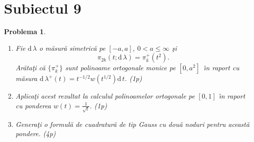 \documentclass[a4paper]{article}%
\newtheorem{problem}[theorem]{Problema}
\begin{document}
\section*{Subiectul 9}

\begin{problem}
\label{pb4.35}

\begin{enumerate}
\item[(a)] Fie $\mathrm{d\,}\lambda$ o m\u{a}sur\u{a} simetric\u{a} pe
$[-a,a]$, $0<a\leq\infty$ \c{s}i
\[
\pi_{2k}(t;\mathrm{d\,}\lambda)=\pi_{k}^{+}(t^{2}).
\]
Ar\u{a}ta\c{t}i c\u{a} $\{\pi_{k}^{+}\}$ sunt polinoame ortogonale monice pe
$[0,a^{2}]$\ \^{\i}n raport cu m\u{a}sura $\mathrm{d\,}\lambda^{+}%
(t)=t^{-1/2}w(t^{1/2})\mathrm{d\,}t$. (1p)

\item[(b)] Aplica\c{t}i acest rezultat la calculul polinoamelor ortogonale pe
$[0,1]$ \^{\i}n raport cu ponderea $w(t)=\frac{1}{\sqrt{t}}$. (1p)

\item[(c)] Genera\c{t}i o formul\u{a} de cuadratur\u{a} de tip Gauss cu
dou\u{a} noduri pentru aceast\u{a} pondere. (4p)\newline
\end{enumerate}
\end{problem}
\end{document}

